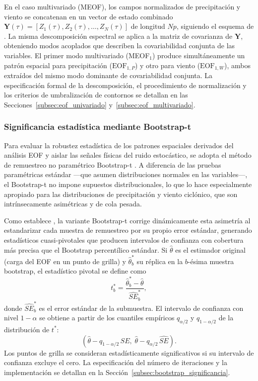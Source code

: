 En el caso multivariado (MEOF), los campos normalizados de precipitación y viento se concatenan en un vector de estado combinado $\mathbf{Y}(\tau) = [Z_1(\tau), Z_2(\tau), \dots, Z_N(\tau)]$ de longitud $Np$, siguiendo el esquema de \citet{bretherton1992intercomparison}. La misma descomposición espectral se aplica a la matriz de covarianza de $\mathbf{Y}$, obteniendo modos acoplados que describen la covariabilidad conjunta de las variables. El primer modo multivariado (MEOF$_1$) produce simultáneamente un patrón espacial para precipitación ($\text{EOF}_{1,P}$) y otro para viento ($\text{EOF}_{1,W}$), ambos extraídos del mismo modo dominante de covariabilidad conjunta. La especificación formal de la descomposición, el procedimiento de normalización y los criterios de umbralización de contornos se detallan en las Secciones~\ref{subsec:eof_univariado} y~\ref{subsec:eof_multivariado}.

\subsubsection{Significancia estadística mediante Bootstrap-t}\label{subsubsec:tb_bootstrap}

Para evaluar la robustez estadística de los patrones espaciales derivados del análisis EOF y aislar las señales físicas del ruido estocástico, se adopta el método de remuestreo no paramétrico Bootstrap-t \citep{efron1993introduction}. A diferencia de las pruebas paramétricas estándar —que asumen distribuciones normales en las variables—, el Bootstrap-t no impone supuestos distribucionales, lo que lo hace especialmente apropiado para las distribuciones de precipitación y viento ciclónico, que son intrínsecamente asimétricas y de cola pesada.

Como establece \citet{hesterberg2015bootstrap}, la variante Bootstrap-t corrige dinámicamente esta asimetría al estandarizar cada muestra de remuestreo por su propio error estándar, generando estadísticos cuasi-pivotales que producen intervalos de confianza con cobertura más precisa que el Bootstrap percentílico estándar. 
Si $\hat{\theta}$ es el estimador original (carga del EOF en un punto de grilla) y $\hat{\theta}^*_b$ su réplica en la $b$-ésima muestra bootstrap, el estadístico pivotal se define como
\begin{equation}\label{eq:bootstrap_t}
t^*_b = \frac{\hat{\theta}^*_b - \hat{\theta}}{\widehat{SE}^*_b},
\end{equation}
donde $\widehat{SE}^*_b$ es el error estándar de la submuestra. El intervalo de confianza con nivel $1-\alpha$ se obtiene a partir de los cuantiles empíricos $q_{\alpha/2}$ y $q_{1-\alpha/2}$ de la distribución de $t^*$:
\begin{equation}\label{eq:bootstrap_ci}
\left(\hat{\theta} - q_{1-\alpha/2}\,\widehat{SE},\; \hat{\theta} - q_{\alpha/2}\,\widehat{SE}\right).
\end{equation}
Los puntos de grilla se consideran estadísticamente significativos si su intervalo de confianza excluye el cero. La especificación del número de iteraciones y la implementación se detallan en la Sección~\ref{subsec:bootstrap_significancia}.